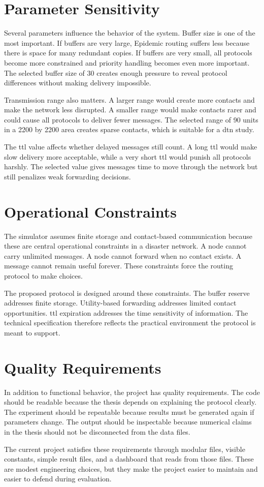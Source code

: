 \section{Parameter Sensitivity}
Several parameters influence the behavior of the system. Buffer size is one of the most important. If buffers are very large, Epidemic routing suffers less because there is space for many redundant copies. If buffers are very small, all protocols become more constrained and priority handling becomes even more important. The selected buffer size of 30 creates enough pressure to reveal protocol differences without making delivery impossible.

Transmission range also matters. A larger range would create more contacts and make the network less disrupted. A smaller range would make contacts rarer and could cause all protocols to deliver fewer messages. The selected range of 90 units in a 2200 by 2200 area creates sparse contacts, which is suitable for a \ac{dtn} study.

The \ac{ttl} value affects whether delayed messages still count. A long \ac{ttl} would make slow delivery more acceptable, while a very short \ac{ttl} would punish all protocols harshly. The selected value gives messages time to move through the network but still penalizes weak forwarding decisions.

\section{Operational Constraints}
The simulator assumes finite storage and contact-based communication because these are central operational constraints in a disaster network. A node cannot carry unlimited messages. A node cannot forward when no contact exists. A message cannot remain useful forever. These constraints force the routing protocol to make choices.

The proposed protocol is designed around these constraints. The buffer reserve addresses finite storage. Utility-based forwarding addresses limited contact opportunities. \ac{ttl} expiration addresses the time sensitivity of information. The technical specification therefore reflects the practical environment the protocol is meant to support.

\section{Quality Requirements}
In addition to functional behavior, the project has quality requirements. The code should be readable because the thesis depends on explaining the protocol clearly. The experiment should be repeatable because results must be generated again if parameters change. The output should be inspectable because numerical claims in the thesis should not be disconnected from the data files.

The current project satisfies these requirements through modular files, visible constants, simple result files, and a dashboard that reads from those files. These are modest engineering choices, but they make the project easier to maintain and easier to defend during evaluation.
